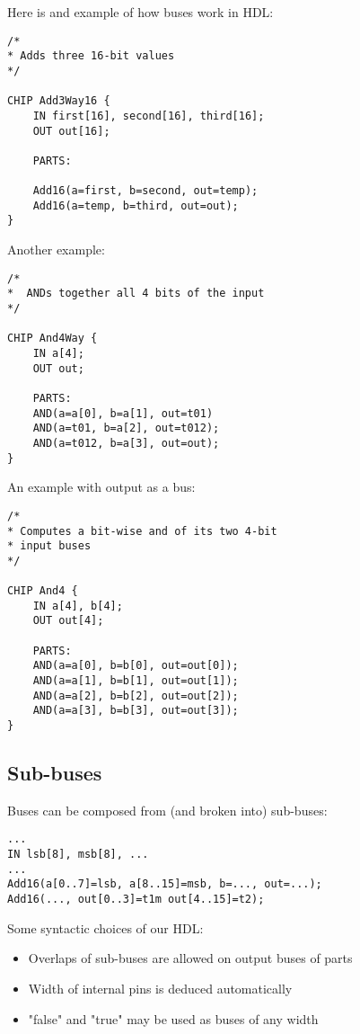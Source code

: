 Here is and example of how buses work in HDL:

\begin{lstlisting}
/*
* Adds three 16-bit values
*/

CHIP Add3Way16 {
    IN first[16], second[16], third[16];
    OUT out[16];

    PARTS:

    Add16(a=first, b=second, out=temp);
    Add16(a=temp, b=third, out=out);
}
\end{lstlisting}

Another example:

\begin{lstlisting}
/*
*  ANDs together all 4 bits of the input
*/

CHIP And4Way {
    IN a[4];
    OUT out;

    PARTS:
    AND(a=a[0], b=a[1], out=t01)
    AND(a=t01, b=a[2], out=t012);
    AND(a=t012, b=a[3], out=out);
}
\end{lstlisting}

An example with output as a bus:

\begin{lstlisting}
/*
* Computes a bit-wise and of its two 4-bit
* input buses
*/

CHIP And4 {
    IN a[4], b[4];
    OUT out[4];

    PARTS:
    AND(a=a[0], b=b[0], out=out[0]);
    AND(a=a[1], b=b[1], out=out[1]);
    AND(a=a[2], b=b[2], out=out[2]);
    AND(a=a[3], b=b[3], out=out[3]);
}
\end{lstlisting}

\subsection{Sub-buses}

Buses can be composed from (and broken into) sub-buses:

\begin{lstlisting}
...
IN lsb[8], msb[8], ...
...
Add16(a[0..7]=lsb, a[8..15]=msb, b=..., out=...);
Add16(..., out[0..3]=t1m out[4..15]=t2);
\end{lstlisting}

Some syntactic choices of our HDL:

\begin{itemize}
    \item Overlaps of sub-buses are allowed on output buses of parts
    \item Width of internal pins is deduced automatically
    \item "false" and "true" may be used as buses of any width
\end{itemize}

